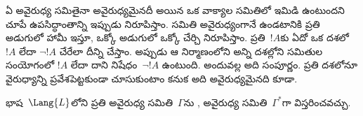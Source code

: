 \documentclass[../../../include/open-logic-section]{subfiles}
\begin{document}
      {}
      {}


\begin{explain}
ఏ అవైరుధ్య  సమితైనా అవైరుధ్యమైనదీ
 అయిన ఒక వాక్యాల సమితిలో ఇమిడి ఉంటుందని చూపే
ఉపసిద్ధాంతాన్ని ఇప్పుడు నిరూపిస్తాం. సమితి అవైరుధ్యంగానే ఉండటానికి ప్రతి
అడుగులో హామీ ఇస్తూ, ఒక్కో అడుగులో ఒక్కో  చేర్చి నిరూపిస్తాం. ప్రతి~$!A$కు ఏదో ఒక దశలో $!A$ లేదా $\lnot !A$
చేరేలా దీన్ని చేస్తాం. అప్పుడు ఆ నిర్మాణంలోని అన్ని దశల్లోని సమితుల సంయోగంలో
$!A$ లేదా దాని నిషేధం~$\lnot !A$ ఉంటుంది. అందువల్ల అది సంపూర్ణం.
ప్రతి దశలోనూ వైరుధ్యాన్ని ప్రవేశపెట్టకుండా చూసుకుంటాం కనుక అది
అవైరుధ్యమైనది కూడా.
\end{explain}

\begin{lem}[లిండెన్‌బామ్ ఉపసిద్ధాంతం]
 భాష~$\Lang{L}$లోని ప్రతి అవైరుధ్య
సమితి~$\Gamma$ను , అవైరుధ్య సమితి~$\Gamma^*$గా
విస్తరించవచ్చు.
\end{lem}
\end{document}
